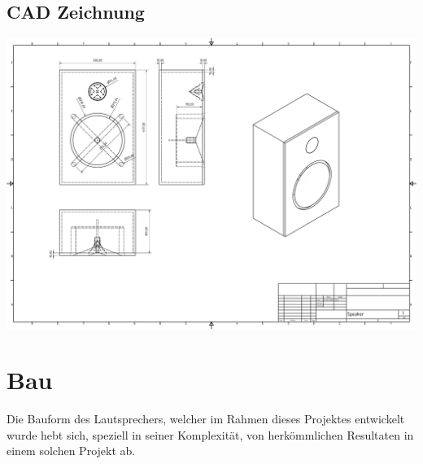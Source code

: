 \documentclass[a4paper,11pt]{report}
\begin{document}
\section{CAD Zeichnung}
\includegraphics[width=1\textwidth]{resources/pdf/Speaker.pdf}
\chapter{Bau}
Die Bauform des Lautsprechers, welcher im Rahmen dieses Projektes entwickelt wurde hebt sich, speziell in seiner Komplexität, von herkömmlichen Resultaten in einem solchen Projekt ab. 
\end{document}

